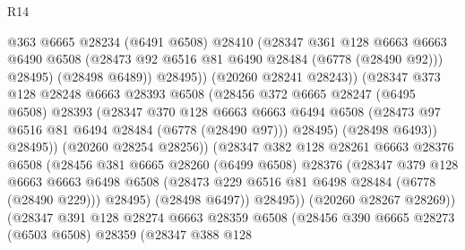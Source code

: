 \begin{lexlean}{R14}
\begin{coremodule}
                            @363
                            @6665
                            @28234
                            (@6491 @6508)
                            @28410
                            (@28347
                              @361
                              @128
                              @6663
                              @6663
                              @6490
                              @6508
                              (@28473 @92 @6516 @81 @6490 @28484 (@6778 (@28490 @92)))
                              @28495)
                            (@28498 @6489))
                          @28495))
                      (@20260 @28241 @28243))
                    (@28347
                      @373
                      @128
                      @28248
                      @6663
                      @28393
                      @6508
                      (@28456
                        @372
                        @6665
                        @28247
                        (@6495 @6508)
                        @28393
                        (@28347
                          @370
                          @128
                          @6663
                          @6663
                          @6494
                          @6508
                          (@28473 @97 @6516 @81 @6494 @28484 (@6778 (@28490 @97)))
                          @28495)
                        (@28498 @6493))
                      @28495))
                  (@20260 @28254 @28256))
                (@28347
                  @382
                  @128
                  @28261
                  @6663
                  @28376
                  @6508
                  (@28456
                    @381
                    @6665
                    @28260
                    (@6499 @6508)
                    @28376
                    (@28347
                      @379
                      @128
                      @6663
                      @6663
                      @6498
                      @6508
                      (@28473 @229 @6516 @81 @6498 @28484 (@6778 (@28490 @229)))
                      @28495)
                    (@28498 @6497))
                  @28495))
              (@20260 @28267 @28269))
            (@28347
              @391
              @128
              @28274
              @6663
              @28359
              @6508
              (@28456
                @390
                @6665
                @28273
                (@6503 @6508)
                @28359
                (@28347
                  @388
                  @128

\end{coremodule}
\end{lexlean}
